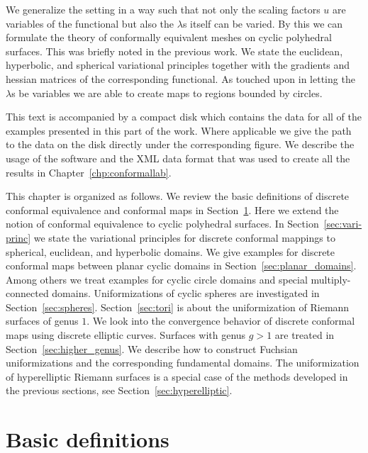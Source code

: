 \documentclass[Thesis]{subfiles}
\begin{document}
We generalize the setting in a way such that not only the scaling factors $u$ are variables of the functional but also the $\lambda$s itself can be varied. 
By this we can formulate the theory of conformally equivalent meshes on cyclic polyhedral surfaces. 
This was briefly noted in the previous work.
We state the euclidean, hyperbolic, and spherical variational principles together with the gradients and hessian matrices of the corresponding functional. 
As touched upon in \cite{Bobenko2010} letting the $\lambda$s be variables we are able to create maps to regions bounded by circles.

This text is accompanied by a compact disk which contains the data for all of the examples presented in this part of the work. 
Where applicable we give the path to the data on the disk directly under the corresponding figure.
We describe the usage of the software and the XML data format that was used to create all the results in Chapter~\ref{chp:conformallab}.


This chapter is organized as follows. We review the basic definitions of discrete conformal equivalence and conformal maps in Section~\ref{sec:basic_definitions}. Here we extend the notion of conformal equivalence to cyclic polyhedral surfaces.
In Section~\ref{sec:vari-princ} we state the variational principles for discrete conformal mappings to spherical, euclidean, and hyperbolic domains.
We give examples for discrete conformal maps between planar cyclic domains in Section~\ref{sec:planar_domains}. 
Among others we treat examples for cyclic circle domains and special multiply-connected domains.
Uniformizations of cyclic spheres are investigated in Section~\ref{sec:spheres}.
Section~\ref{sec:tori} is about the uniformization of Riemann surfaces of genus $1$.
We look into the convergence behavior of discrete conformal maps using discrete elliptic curves.
 Surfaces with genus $g>1$ are treated in Section~\ref{sec:higher_genus}.
 We describe how to construct Fuchsian uniformizations and the corresponding fundamental domains.
 The uniformization of hyperelliptic Riemann surfaces is a special case of the methods developed in the previous sections, see Section~\ref{sec:hyperelliptic}.

\section{Basic definitions}
\label{sec:basic_definitions}
\end{document}
